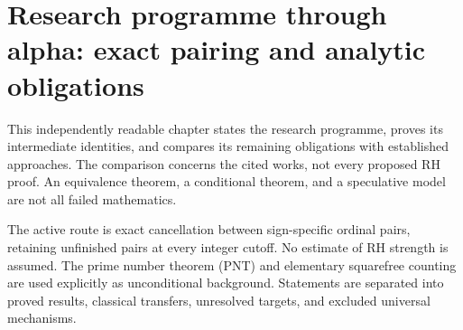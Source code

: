 \section{Research programme through alpha: exact pairing and analytic obligations}
\label{sec:alpha-programme}

This independently readable chapter states the research programme, proves
its intermediate identities, and compares its remaining obligations with
established approaches. The comparison concerns the cited works, not every
proposed RH proof. An equivalence theorem, a conditional theorem, and a
speculative model are not all failed mathematics.

The active route is exact cancellation between sign-specific ordinal pairs,
retaining unfinished pairs at every integer cutoff. No estimate of RH
strength is assumed. The prime number theorem (PNT) and elementary squarefree
counting are used explicitly as unconditional background. Statements are
separated into proved results, classical transfers, unresolved targets,
and excluded universal mechanisms.


